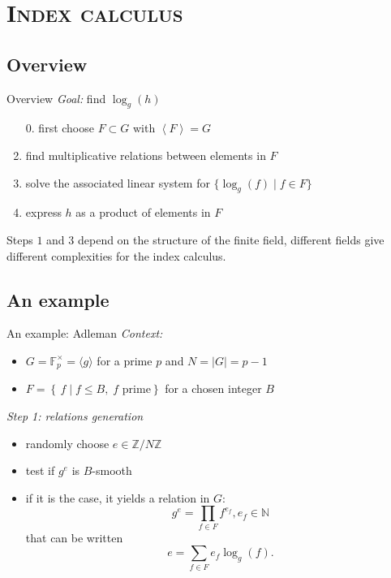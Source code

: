 \documentclass[xcolor=x11names,compress]{beamer}
\theoremstyle{break}
\theoremstyle{sc}
\theoremstyle{definition}
\theoremstyle{remark}
\begin{document}
\section{\scshape Index calculus}
\subsection{Overview}
\begin{frame}{Overview}
  \emph{Goal:} find $\log_g(h)$ 
  \begin{enumerate}
    \item[0.] first choose $F\subset
  G$ with $\left\langle F \right\rangle = G$
    \item find multiplicative relations between elements in $F$
    \item solve the associated linear system for $\{ \log_g(f)\;|\;f\in F\}$
    \item express $h$ as a product of elements in $F$
  \end{enumerate}
  Steps $1$ and $3$ depend on the structure of the finite field, different
  fields give different complexities for the index calculus.
\end{frame}

\subsection{An example}
\begin{frame}{An example: Adleman}
  \emph{Context:}
  \begin{itemize}
    \item $G = \mathbb{F}_p^\times = \langle g\rangle$ for a prime $p$ and $N = |G| = p-1$
    \item $F = \left\{\, f \;|\; f \leq B,\; f \text{ prime}
    \right\}$ for a chosen integer $B$
  \end{itemize}

  \emph{Step 1: relations generation}
  \begin{itemize}
    \item randomly choose $e\in \mathbb{Z}/N\mathbb{Z}$
    \item test if $g^e$ is $B$-smooth
    \item if it is the case, it yields a relation in $G$:
      \[ 
        g^e = \prod_{f\in F}f^{e_f}, e_f\in \mathbb{N}
      \]
      that can be written
      \[
        e = \sum_{f\in F}e_f\log_g(f).
      \]
  \end{itemize}
\end{frame}
\end{document}
